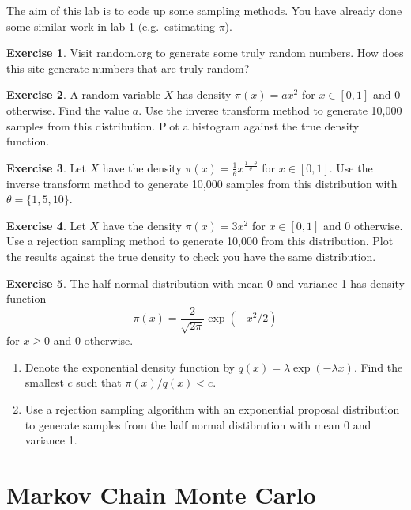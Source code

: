 \documentclass[
]{book}
\providecommand{\tightlist}{%
  \setlength{\itemsep}{0pt}\setlength{\parskip}{0pt}}
\theoremstyle{definition}
\theoremstyle{definition}
\theoremstyle{definition}
\newtheorem{exercise}{Exercise}[chapter]
\theoremstyle{definition}
\theoremstyle{remark}
\begin{document}
The aim of this lab is to code up some sampling methods. You have already done some similar work in lab 1 (e.g.~estimating \(\pi\)).

\begin{exercise}
Visit random.org to generate some truly random numbers. How does this site generate numbers that are truly random?
\end{exercise}

\begin{exercise}
A random variable \(X\) has density \(\pi(x) = ax^2\) for \(x\in[0,1]\) and 0 otherwise. Find the value \(a\). Use the inverse transform method to generate 10,000 samples from this distribution. Plot a histogram against the true density function.
\end{exercise}

\begin{exercise}
Let \(X\) have the density \(\pi(x) = \frac{1}{\theta}x^{\frac{1-\theta}{\theta}}\) for \(x \in [0, 1]\). Use the inverse transform method to generate 10,000 samples from this distribution with \(\theta = \{1, 5, 10\}\).
\end{exercise}

\begin{exercise}
Let \(X\) have the density \(\pi(x) = 3x^2\) for \(x \in [0, 1]\) and 0 otherwise. Use a rejection sampling method to generate 10,000 from this distribution. Plot the results against the true density to check you have the same distribution.
\end{exercise}

\begin{exercise}

The half normal distribution with mean 0 and variance 1 has density function
\[
\pi(x) = \frac{2}{\sqrt{2\pi}}\exp{(-x^2/2)}
\]
for \(x \geq 0\) and 0 otherwise.

\begin{enumerate}
\def\labelenumi{\arabic{enumi}.}
\tightlist
\item
  Denote the exponential density function by \(q(x) = \lambda \exp(-\lambda x)\). Find the smallest \(c\) such that \(\pi(x)/q(x) < c\).
\item
  Use a rejection sampling algorithm with an exponential proposal distribution to generate samples from the half normal distibrution with mean 0 and variance 1.
\end{enumerate}

\end{exercise}

\hypertarget{markov-chain-monte-carlo}{%
\chapter{Markov Chain Monte Carlo}\label{markov-chain-monte-carlo}}
\end{document}
